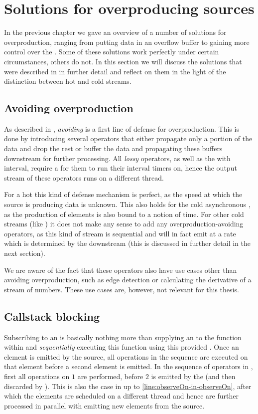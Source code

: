 \section{Solutions for overproducing sources}
In the previous chapter we gave an overview of a number of solutions for overproduction, ranging from putting data in an overflow buffer to gaining more control over the \obs. Some of these solutions work perfectly under certain circumstances, others do not. In this section we will discuss the solutions that were described in  in further detail and reflect on them in the light of the distinction between hot and cold streams.

\subsection{Avoiding overproduction}
As described in , \textit{avoiding} is a first line of defense for overproduction. This is done by introducing several operators that either propagate only a portion of the data and drop the rest or buffer the data and propagating these buffers downstream for further processing. All \textit{lossy} operators, as well as the  with interval, require a \sch for them to run their interval timers on, hence the output stream of these operators runs on a different thread.

For a hot \obs this kind of defense mechanism is perfect, as the speed at which the source is producing data is unknown. This also holds for the cold asynchronous \obs, as the production of elements is also bound to a notion of time. For other cold streams (like ) it does not make any sense to add any overproduction-avoiding operators, as this kind of stream is sequential and will in fact emit at a rate which is determined by the downstream (this is discussed in further detail in the next section).

We are aware of the fact that these operators also have use cases other than avoiding overproduction, such as edge detection or calculating the derivative of a stream of numbers. These use cases are, however, not relevant for this thesis.

\subsection{Callstack blocking}
Subscribing to an \obs is basically nothing more than supplying an \obv to the function within  and \emph{sequentially} executing this function using this provided \obv. Once an element is emitted by the source, all operations in the \obs sequence are executed on that element before a second element is emitted. In the sequence of operators in , first all operations on $1$ are performed, before $2$ is emitted by the \obs (and then discarded by ). This is also the case in  up to \cref{line:observeOn-in-observeOn}, after which the elements are scheduled on a different thread and hence are further processed in parallel with emitting new elements from the source.


